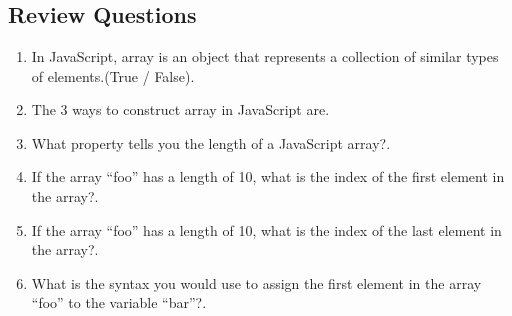 \documentclass[11pt,a4paper]{article}
\begin{document}
\section*{}
\subsection*{Review Questions}
\begin{enumerate}\itemsep10pt
\item In JavaScript, array is an object that represents a collection of similar types of elements.(True / False)\underline{\hspace{3cm}}.
\item The 3 ways to construct array in JavaScript are\underline{\hspace{3cm}}.
\item What property tells you the length of a JavaScript array?\underline{\hspace{3cm}}.
\item If the array ``foo'' has a length of 10, what is the index of the first element in the array?\underline{\hspace{3cm}}.
\item If the array ``foo'' has a length of 10, what is the index of the last element in the array?\underline{\hspace{3cm}}.
\item What is the syntax you would use to assign the first element in the array ``foo'' to the variable ``bar''?\underline{\hspace{3cm}}.


\end{enumerate}
\end{document}
